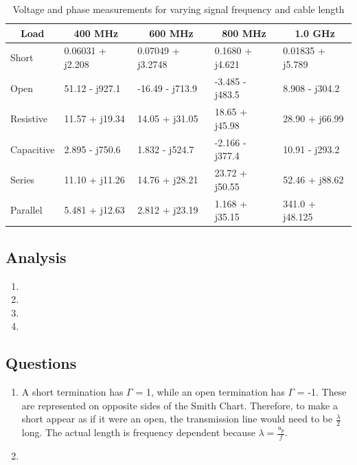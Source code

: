 \documentclass{article}
\begin{document}
\begin{table}[H]
\centering
\begin{tabular}{|l|l|l|l|l|}
\hline
\multicolumn{1}{|c|}{\textbf{Load}} & \multicolumn{1}{c|}{\textbf{400 MHz}} & \multicolumn{1}{c|}{\textbf{600 MHz}} & \multicolumn{1}{c|}{\textbf{800 MHz}} & \multicolumn{1}{c|}{\textbf{1.0 GHz}} \\ \hline
Short                               & 0.06031 + j2.208                      & 0.07049 + j3.2748                     & 0.1680 + j4.621                       & 0.01835 + j5.789                      \\ \hline
Open                                & 51.12 - j927.1                        & -16.49 - j713.9                       & -3.485 - j483.5                       & 8.908 - j304.2                        \\ \hline
Resistive                           & 11.57 + j19.34                        & 14.05 + j31.05                        & 18.65 + j45.98                        & 28.90 + j66.99                        \\ \hline
Capacitive                          & 2.895 - j750.6                        & 1.832 - j524.7                        & -2.166 - j377.4                       & 10.91 - j293.2                        \\ \hline
Series                              & 11.10 + j11.26                        & 14.76 + j28.21                        & 23.72 + j50.55                        & 52.46 + j88.62                        \\ \hline
Parallel                            & 5.481 + j12.63                        & 2.812 + j23.19                        & 1.168 + j35.15                        & 341.0 + j48.125
\\ \hline
\end{tabular}
	\caption{Voltage and phase measurements for varying signal frequency and cable length}
	\label{Data 1}
\end{table}
\subsection{Analysis}
\begin{enumerate}
	\item
	\item
	\item
	\item
\end{enumerate}
\subsection{Questions}
\begin{enumerate}
	\item A short termination has $\Gamma$ = 1, while an open termination has $\Gamma$ = -1. These are represented on opposite sides of the Smith Chart. Therefore, to make a short appear as if it were an open, the transmission line would need to be $\frac{\lambda}{2}$ long. The actual length is frequency dependent because $\lambda = \frac{u_p}{f}$.
	\item
\end{enumerate}
\end{document}
